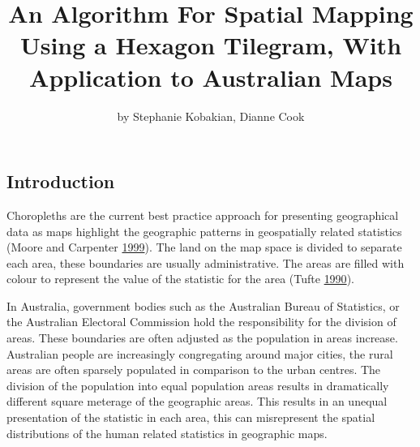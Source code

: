\title{An Algorithm For Spatial Mapping Using a Hexagon Tilegram, With
Application to Australian Maps}
\author{by Stephanie Kobakian, Dianne Cook}

\maketitle



\hypertarget{introduction}{%
\subsection{Introduction}\label{introduction}}

Choropleths are the current best practice approach for presenting
geographical data as maps highlight the geographic patterns in
geospatially related statistics (Moore and Carpenter
\protect\hyperlink{ref-SAMGIS}{1999}). The land on the map space is
divided to separate each area, these boundaries are usually
administrative. The areas are filled with colour to represent the value
of the statistic for the area (Tufte \protect\hyperlink{ref-EI}{1990}).

In Australia, government bodies such as the Australian Bureau of
Statistics, or the Australian Electoral Commission hold the
responsibility for the division of areas. These boundaries are often
adjusted as the population in areas increase. Australian people are
increasingly congregating around major cities, the rural areas are often
sparsely populated in comparison to the urban centres. The division of
the population into equal population areas results in dramatically
different square meterage of the geographic areas. This results in an
unequal presentation of the statistic in each area, this can
misrepresent the spatial distributions of the human related statistics
in geographic maps.

